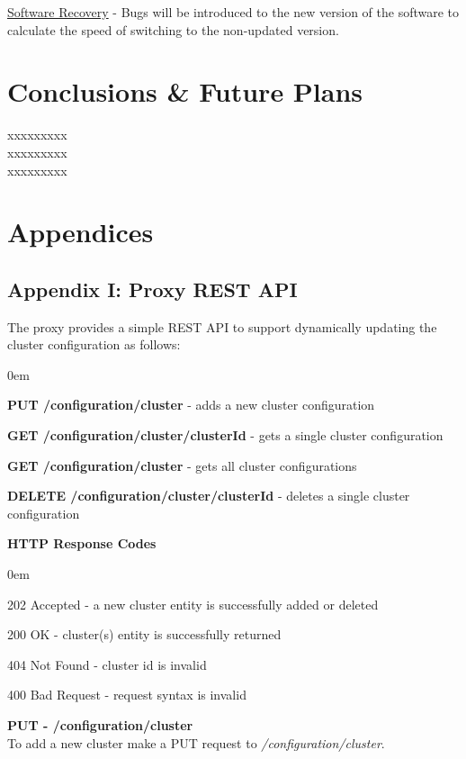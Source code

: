 \documentclass[a4paper,11pt,twoside]{article}
\begin{document}
\noindent
\underline{Software Recovery} - Bugs will be introduced to the new version of the software to calculate the speed of switching to the non-updated version.


\clearpage
\section{Conclusions \& Future Plans}
xxxxxxxxx\\
xxxxxxxxx\\
xxxxxxxxx\\


\clearpage
\section{Appendices}

\subsection{Appendix I: Proxy REST API}\label{Appendix I}
The proxy provides a simple REST API to support dynamically updating the cluster configuration as follows:

\begin{list}{-}{}
  \itemsep0em
  \item \textbf{PUT /configuration/cluster} - adds a new cluster configuration  
 \item\textbf{GET /configuration/cluster/{clusterId}} - gets a single cluster configuration
 \item\textbf{GET /configuration/cluster} - gets all cluster configurations
 \item\textbf{DELETE /configuration/cluster/{clusterId}} - deletes a single cluster configuration
\end{list}

\noindent
\textbf{HTTP Response Codes}
\begin{list}{-}{}
  \itemsep0em
\item 202 Accepted - a new cluster entity is successfully added or deleted 
\item 200 OK - cluster(s) entity is successfully returned   
\item 404 Not Found - cluster id is invalid
\item 400 Bad Request - request syntax is  invalid
\end{list}

\noindent
\textbf{PUT - /configuration/cluster}\\
To add a new cluster make a PUT request to \textit{/configuration/cluster}.\\
\end{document}
